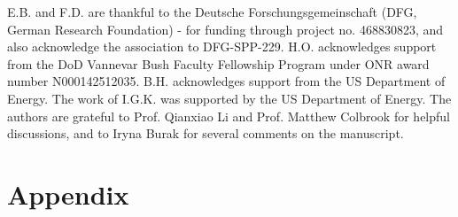 \documentclass{article}
\begin{document}
\begin{ack}
E.B. and F.D. are thankful to the Deutsche Forschungsgemeinschaft (DFG, German Research Foundation) - for funding through project no. 468830823, and also acknowledge the association to DFG-SPP-229. H.O. acknowledges support from the DoD Vannevar Bush Faculty Fellowship Program under ONR award number N000142512035. B.H. acknowledges support from the  US Department of Energy. The work of I.G.K. was supported by the US Department of Energy.
The authors are grateful to Prof. Qianxiao Li and Prof. Matthew Colbrook for helpful discussions, and to Iryna Burak for several comments on the manuscript.
\end{ack}



\appendix
\section{Appendix}
\end{document}
